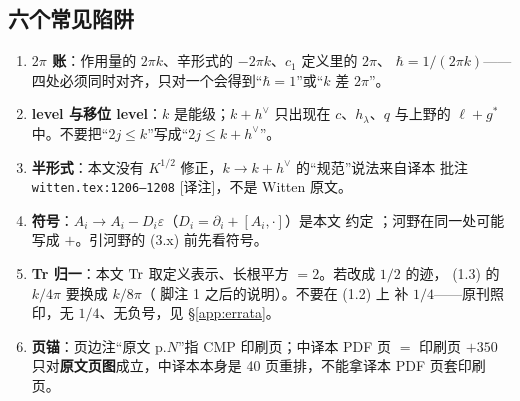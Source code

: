 \subsection{六个常见陷阱}

\begin{enumerate}[leftmargin=1.8em]
\item \textbf{$2\pi$ 账}：作用量的 $2\pi k$、辛形式的 $-2\pi k$、$c_1$ 定义里的 $2\pi$、
$\hbar=1/(2\pi k)$——四处必须同时对齐，只对一个会得到“$\hbar=1$”或“$k$ 差 $2\pi$”。
\item \textbf{level 与移位 level}：$k$ 是能级；$k+h^\vee$ 只出现在 $c$、$h_\lambda$、$q$
与上野的 $\ell+g^*$ 中。不要把“$2j\le k$”写成“$2j\le k+h^\vee$”。
\item \textbf{半形式}：本文没有 $K^{1/2}$ 修正，$k\to k+h^\vee$ 的“规范”说法来自译本
批注 \texttt{witten.tex:1206--1208} [译注]，不是 Witten 原文。
\item \textbf{符号}：$A_i\to A_i-D_i\varepsilon$（$D_i=\partial_i+[A_i,\cdot]$）是本文
约定 ；河野在同一处可能写成 $+$。引河野的 (3.x) 前先看符号。
\item \textbf{Tr 归一}：本文 $\operatorname{Tr}$ 取定义表示、长根平方 $=2$。若改成 $1/2$ 的迹，
(1.3) 的 $k/4\pi$ 要换成 $k/8\pi$（ 脚注 1 之后的说明）。不要在 (1.2) 上
补 $1/4$——原刊照印，无 $1/4$、无负号，见 \S\ref{app:errata}。
\item \textbf{页锚}：页边注“原文 p.$N$”指 CMP 印刷页；中译本 PDF 页 $=$ 印刷页 $+350$
只对\textbf{原文页图}成立，中译本本身是 40 页重排，不能拿译本 PDF 页套印刷页。
\end{enumerate}
